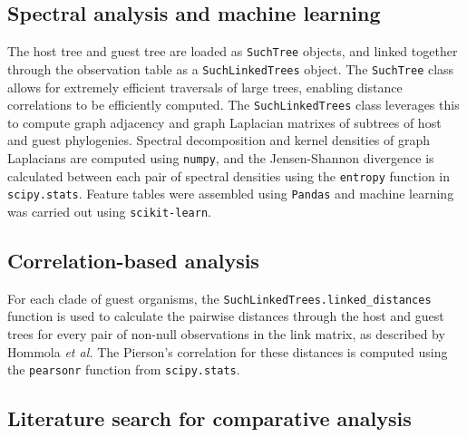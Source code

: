 

\subsection{Spectral analysis and machine learning}


The host tree and guest tree are loaded as {\tt SuchTree} objects, and linked together through the observation table as a {\tt SuchLinkedTrees} object. The {\tt SuchTree} class allows for extremely efficient traversals of large trees, enabling distance correlations to be efficiently computed. The {\tt SuchLinkedTrees} class leverages this to compute graph adjacency and graph Laplacian matrixes of subtrees of host and guest phylogenies. Spectral decomposition and kernel densities of graph Laplacians are computed using {\tt numpy}, and the Jensen-Shannon divergence is calculated between each pair of spectral densities using the {\tt entropy} function in {\tt scipy.stats}. \cite{walt2011numpy} Feature tables were assembled using {\tt Pandas} \cite{mckinney2010data} and machine learning was carried out using {\tt scikit-learn}. \cite{pedregosa2011scikit}

\subsection{Correlation-based analysis}

For each clade of guest organisms, the {\tt SuchLinkedTrees.linked\_distances} function is used to calculate the pairwise distances through the host and guest trees for every pair of non-null observations in the link matrix, as described by Hommola {\em et al.} \cite{hommola2009permutation} The Pierson's correlation for these distances is computed using the {\tt pearsonr} function from {\tt scipy.stats}. \cite{walt2011numpy}

\subsection{Literature search for comparative analysis}

